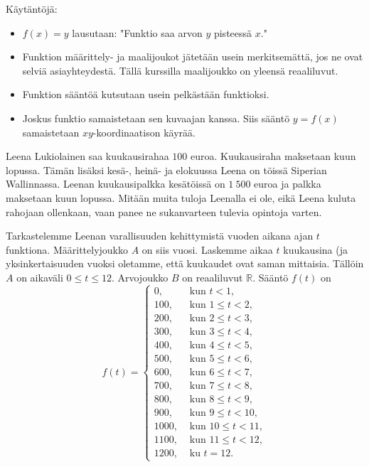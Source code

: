
Käytäntöjä:
\begin{itemize}
\item $f(x) = y$ lausutaan: "Funktio saa arvon $y$ pisteessä $x$."
\item Funktion määrittely- ja maalijoukot jätetään usein merkitsemättä, jos ne ovat selviä asiayhteydestä. Tällä kurssilla maalijoukko on yleensä reaaliluvut.
\item Funktion sääntöä kutsutaan usein pelkästään funktioksi.
\item Joskus funktio samaistetaan sen kuvaajan kanssa.  Siis sääntö $y=f(x)$ samaistetaan $xy$-koordinaatison käyrää.
\end{itemize}

\begin{esimerkki}
Leena Lukiolainen saa kuukausirahaa $100$ euroa.  Kuukausiraha maksetaan kuun lopussa. Tämän lisäksi kesä-, heinä- ja elokuussa Leena on töissä Siperian Wallinnassa.  Leenan kuukausipalkka kesätöissä on $1\ 500$ euroa ja palkka maksetaan kuun lopussa.  Mitään muita tuloja Leenalla ei ole, eikä Leena kuluta rahojaan ollenkaan, vaan panee ne sukanvarteen tulevia opintoja varten. 

Tarkastelemme Leenan varallisuuden kehittymistä vuoden aikana ajan $t$ funktiona. Määrittelyjoukko $A$ on siis vuosi. Laskemme aikaa $t$ kuukausina (ja yksinkertaisuuden vuoksi oletamme, että kuukaudet ovat saman mittaisia. Tällöin $A$ on aikaväli $0\le t\le 12$. Arvojoukko $B$ on reaaliluvut $\mathbb{R}$.  Sääntö $f(t)$ on
$$
f(t) = \left\{\begin{array}{rl}
0, & \text{ kun } t<1, \\
100, & \text{ kun } 1\le t < 2, \\
200, & \text{ kun } 2\le t < 3, \\
300, & \text{ kun } 3\le t < 4, \\
400, & \text{ kun } 4\le t < 5, \\
500, & \text{ kun } 5\le t < 6, \\
600, & \text{ kun } 6\le t < 7, \\
700, & \text{ kun } 7\le t < 8, \\
800, & \text{ kun } 8\le t < 9, \\
900, & \text{ kun } 9\le t < 10, \\
1000, & \text{ kun } 10\le t < 11, \\
1100, & \text{ kun } 11\le t < 12, \\
1200, & \text{ ku } t=12.
\end{array}\right.
$$
\end{esimerkki}

